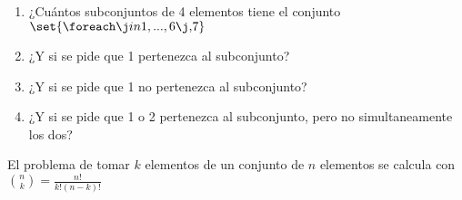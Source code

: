 \begin{enunciado}{\ejercicio}

  \begin{enumerate}[label=\roman*)]
    \item ¿Cuántos subconjuntos de 4 elementos tiene el conjunto
          $\set{\foreach \j in {1,...,6}{ \j, }7} $
    \item ¿Y si se pide que 1 pertenezca al subconjunto?
    \item ¿Y si se pide que 1 no pertenezca al subconjunto?
    \item ¿Y si se pide que 1 o 2 pertenezca al subconjunto, pero no simultaneamente los dos?
  \end{enumerate}

\end{enunciado}

El problema de tomar $k$ elementos de un conjunto de $n$ elementos se calcula con
$\binom{n}{k} = \frac{n!}{k!(n-k)!}$

